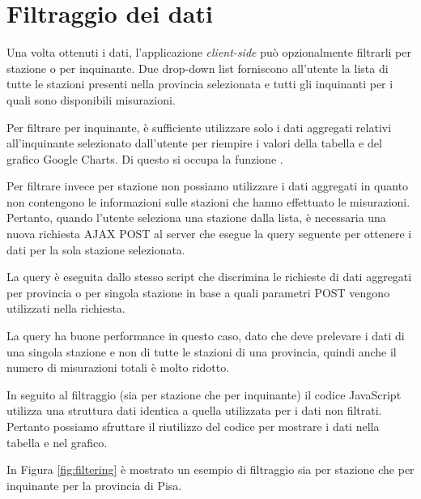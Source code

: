 \section{Filtraggio dei dati}

Una volta ottenuti i dati, l'applicazione \textit{client-side}  può opzionalmente filtrarli per stazione o
per inquinante. Due drop-down list forniscono all'utente la lista di tutte le
stazioni presenti nella provincia selezionata e tutti gli inquinanti per i quali
sono disponibili misurazioni.

Per filtrare per inquinante, è sufficiente utilizzare solo i dati aggregati
relativi all'inquinante selezionato dall'utente per riempire i valori della
tabella e del grafico Google Charts. Di questo si occupa la funzione
.

Per filtrare invece per stazione non possiamo utilizzare i dati aggregati in
quanto non contengono le informazioni sulle stazioni che hanno effettuato le
misurazioni. Pertanto, quando l'utente seleziona una stazione dalla lista, è
necessaria una nuova richiesta AJAX POST al server che esegue la query seguente
per ottenere i dati per la sola stazione selezionata.

La query è eseguita dallo stesso script  che
discrimina le richieste di dati aggregati per provincia o per singola stazione
in base a quali parametri POST vengono utilizzati nella richiesta.

La query ha buone performance in questo caso, dato che deve prelevare i dati di
una singola stazione e non di tutte le stazioni di una provincia, quindi anche
il numero di misurazioni totali è molto ridotto.

In seguito al filtraggio (sia per stazione che per inquinante) il codice
JavaScript utilizza una struttura dati identica a quella utilizzata per i dati
non filtrati. Pertanto possiamo sfruttare il riutilizzo del codice per mostrare
i dati nella tabella e nel grafico.

In Figura \ref{fig:filtering} è mostrato un esempio di filtraggio sia per
stazione che per inquinante per la provincia di Pisa.

